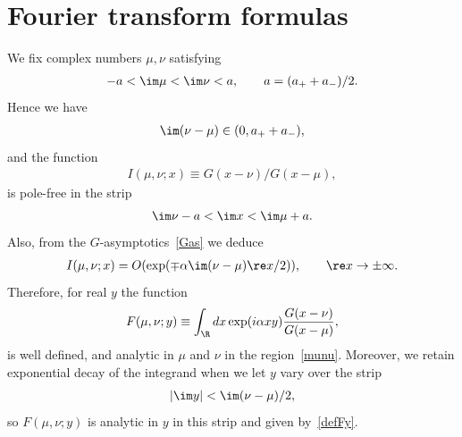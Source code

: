 \documentclass[pdftex]{sigma}
\numberwithin{equation}{section}
\begin{document}

																																												 

\section{Fourier transform formulas}\label{appendixC}

We f\/ix complex numbers $\mu,\nu$ satisfying
\begin{gather}\label{munu}
-a<\im \mu<\im \nu <a,\qquad a=(a_{+}+a_{-})/2.
\end{gather}
Hence we have
\begin{gather}
\im (\nu-\mu)\in(0,a_{+}+a_{-}),
\end{gather}
and the function
\begin{gather}\label{defI}
I(\mu,\nu;x)\equiv G(x-\nu)/G(x-\mu),
\end{gather}
is pole-free in the strip
\begin{gather}\label{xstrip}
\im \nu -a<\im x<\im \mu +a.
\end{gather}
Also, from the $G$-asymptotics~\eqref{Gas} we deduce
\begin{gather}
I(\mu,\nu;x)=O(\exp(\mp \alpha\im (\nu -\mu)\re x/2)),\qquad \re x\to\pm\infty.
\end{gather}
Therefore, for real $y$ the function
\begin{gather}\label{defFy}
F(\mu,\nu;y)\equiv \int_{\R}dx \exp(i\alpha xy)\frac{G(x-\nu)}{G(x-\mu)},
\end{gather}
is well def\/ined, and analytic in $\mu$ and $\nu$ in the region~\eqref{munu}. Moreover, we retain exponential decay of the integrand when we let $y$ vary over the strip
\begin{gather}\label{ystrip}
|\im y|<\im(\nu-\mu)/2,
\end{gather}
so $F(\mu,\nu;y)$ is analytic in $y$ in this strip and given by~\eqref{defFy}.
\end{document}
